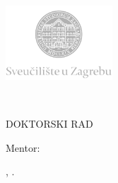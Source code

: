 \makeatletter
\begin{titlepage}
   \begin{Center}

       \includegraphics[width=0.30\textwidth]{figures/logo/uni_zg_logo_hr.png}
       
       \vspace{-0.2cm}
       
       {\fontsize{16pt}{19.2pt}\selectfont\@HRfaculty\\
                                          \@HRdepartment\par}

       \vspace{2.5cm}
       
       {\fontsize{16pt}{19.2pt}\selectfont\@author}
       
       \vspace{3.0cm}
       
       {\fontsize{22pt}{26.4pt}\selectfont\textbf{\@HRtitle}\par}
       
       \vspace{2.0cm}

       {\fontsize{16pt}{19.2pt}\selectfont DOKTORSKI RAD}
       
       \vspace{2.0cm}
       
       {\fontsize{16pt}{19.2pt}\selectfont Mentor:\\
                                           \@HRsupervisor\par}

       \vfill
       
       {\fontsize{14pt}{16.8pt}\selectfont\@place, \@date.}
            
   \end{Center}
\end{titlepage}
\makeatother

\restoregeometry

\pagestyle{frontmatter}

\rmfamily


\setcounter{page}{1}
